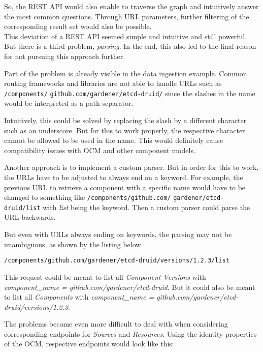 So, the REST API would also enable to traverse the graph and intuitively answer the most common questions. Through URL parameters, further filtering of the corresponding result set would also be possible.\\

This deviation of a REST API seemed simple and intuitive and still powerful. But there is a third problem, \emph{parsing}. In the end, this also led to the final reason for not pursuing this approach further.\par
Part of the problem is already visible in the data ingestion example. Common routing frameworks and libraries are not able to handle URLs such as \lstinline|/components/| \lstinline|github.com/gardener/etcd-druid/| since the slashes in the name would be interpreted as a path separator.\par 
Intuitively, this could be solved by replacing the slash by a different character such as an underscore. But for this to work properly, the respective character cannot be allowed to be used in the name. This would definitely cause compatibility issues with OCM and other component models.\par 
Another approach is to implement a custom parser. But in order for this to work, the URLs have to be adjusted to always end on a keyword. For example, the previous URL to retrieve a component with a specific name would have to be changed to something like \lstinline|/components/github.com/| \lstinline|gardener/etcd-druid/list| with \emph{list} being the keyword. Then a custom parser could parse the URL backwards.\par
But even with URLs always ending on keywords, the parsing may not be unambiguous, as shown by the listing below.

\begin{lstlisting}[caption=Ambiguous REST API URL, captionpos=b, label=lst:Ambiguous URL]
/components/github.com/gardener/etcd-druid/versions/1.2.3/list
\end{lstlisting}

This request could be meant to list all \emph{Component Versions} with \emph{component\_name = github.com/gardener/etcd-druid}. But it could also be meant to list all \emph{Components} with \emph{component\_name = github.com/gardener/etcd-druid/versions/1.2.3}.\par
The problems become even more difficult to deal with when considering corresponding endpoints for \emph{Sources} and \emph{Resources}. Using the identity properties of the OCM, respective endpoints would look like this:

